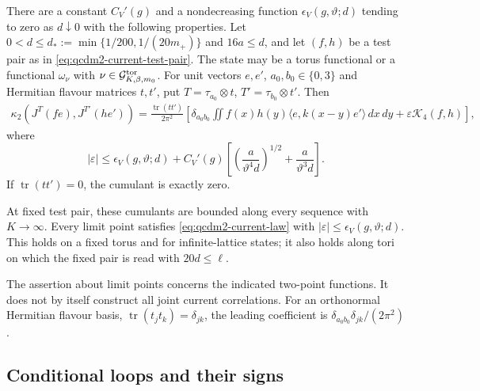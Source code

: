 \documentclass[11pt,letterpaper,reqno]{amsart}
\makeatletter
\theoremstyle{definition}
\newcommand{\ms@majorstart}{%
  \pushQED{\qed}\renewcommand{\qedsymbol}{$\blacksquare\square$}}
\newenvironment{theorem}[1][]{\ms@majorstart\ms@theorem[#1]}
  {\popQED\endms@theorem}
\theoremstyle{remark}
\makeatother
\begin{document}
\begin{theorem}[Two currents]\label{C-417-14}
There are a constant $C_V'(g)$ and a nondecreasing function
$\epsilon_V(g,\vartheta;d)$ tending to zero as $d\downarrow0$
with the following properties.  Let
$0<d\le d_*:=\min\{1/200,1/(20{m_+})\}$ and $16a\le d$,
and let $(f,h)$ be a test pair as in
\eqref{eq:qcdm2-current-test-pair}.  The state may be a torus
functional or a functional $\omega_\nu$ with
$\nu\in\mathcal G^{\rm tor}_{K,\beta,m_0}$.
For unit vectors $e,e'$, $a_0,b_0\in\{0,3\}$ and Hermitian
flavour matrices $t,t'$, put $T=\tau_{a_0}\otimes t$,
$T'=\tau_{b_0}\otimes t'$.  Then
\begin{align}
 \kappa_2(J^T(fe),J^{T'}(he'))
  =\frac{\operatorname{tr}(tt')}{2\pi^2}
  \left[\delta_{a_0b_0}
       \iint f(x)h(y)\langle e,k(x-y)e'\rangle\,dx\,dy
                     +\varepsilon\mathcal K_4(f,h)\right],
 \label{eq:qcdm2-current-law}
\end{align}
where
\begin{equation}\label{eq:qcdm2-current-law-error}
 |\varepsilon|\le\epsilon_V(g,\vartheta;d)
       +C_V'(g)\left[
          \left(\frac{a}{\vartheta^4d}\right)^{1/2}
                         +\frac{a}{\vartheta^3d}\right].
\end{equation}
If $\operatorname{tr}(tt')=0$, the cumulant is exactly zero.

At fixed test pair, these cumulants are bounded along every
sequence with $K\to\infty$.  Every limit point satisfies
\eqref{eq:qcdm2-current-law} with
$|\varepsilon|\le\epsilon_V(g,\vartheta;d)$.
This holds on a fixed torus and for infinite-lattice states;
it also holds along tori on which the fixed pair is read with
$20d\le\ell$.
\end{theorem}

The assertion about limit points concerns the indicated two-point
functions.  It does not by itself construct all joint current
correlations.  For an orthonormal Hermitian flavour basis,
$\operatorname{tr}(t_jt_k)=\delta_{jk}$, the leading coefficient
is $\delta_{a_0b_0}\delta_{jk}/(2\pi^2)$.

\subsection{Conditional loops and their signs}
\end{document}
